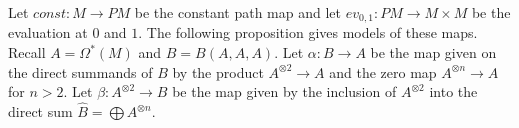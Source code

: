 \documentclass{scrartcl}
\theoremstyle{plain}
\theoremstyle{definition}
\newtheorem{remark}[theorem]{Remark}
\let\xto\xrightarrow
\begin{document}


Let $const\colon M\to PM$ be the constant path map and let $ev_{0,1}\colon PM\to M\times M$ be the evaluation at $0$ and $1$. The following proposition gives models of these maps. Recall $A=\Omega^*(M)$ and $B = B(A, A, A)$. Let $\alpha\colon B\to A$ be the map given on the direct summands of $B$ by the product $A^{\otimes 2}\to A$ and the zero map $A^{\otimes n}\to A$ for $n>2$. Let $\beta\colon A^{\otimes 2}\to B$ be the map given by the inclusion of $A^{\otimes 2}$ into the direct sum $\hat B = \bigoplus A^{\otimes n}$.
\end{document}
